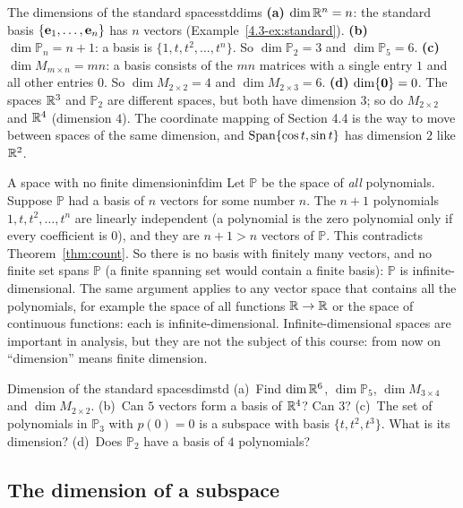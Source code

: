 \documentclass[11pt]{article}
\begin{document}
\begin{exmp}{The dimensions of the standard spaces}{stddims}
\textbf{(a)} $\dim\mathbb{R}^n=n$: the standard basis $\{\mathbf{e}_1,\dots,\mathbf{e}_n\}$ has $n$ vectors (Example~\ref{4.3-ex:standard}). \textbf{(b)} $\dim\mathbb{P}_n=n+1$: a basis is $\{1,t,t^2,\dots,t^n\}$. So $\dim\mathbb{P}_2=3$ and $\dim\mathbb{P}_5=6$. \textbf{(c)} $\dim M_{m\times n}=mn$: a basis consists of the $mn$ matrices with a single entry $1$ and all other entries $0$. So $\dim M_{2\times2}=4$ and $\dim M_{2\times3}=6$. \textbf{(d)} $\dim\{\mathbf{0}\}=0$. The spaces $\mathbb{R}^3$ and $\mathbb{P}_2$ are different spaces, but both have dimension $3$; so do $M_{2\times2}$ and $\mathbb{R}^4$ (dimension $4$). The coordinate mapping of Section 4.4 is the way to move between spaces of the same dimension, and $\operatorname{Span}\{\cos t,\sin t\}$ has dimension $2$ like $\mathbb{R}^2$.
\end{exmp}

\begin{exmp}{A space with no finite dimension}{infdim}
Let $\mathbb{P}$ be the space of \emph{all} polynomials. Suppose $\mathbb{P}$ had a basis of $n$ vectors for some number $n$. The $n+1$ polynomials $1,t,t^2,\dots,t^n$ are linearly independent (a polynomial is the zero polynomial only if every coefficient is $0$), and they are $n+1>n$ vectors of $\mathbb{P}$. This contradicts Theorem~\ref{thm:count}. So there is no basis with finitely many vectors, and no finite set spans $\mathbb{P}$ (a finite spanning set would contain a finite basis): $\mathbb{P}$ is infinite-dimensional. The same argument applies to any vector space that contains all the polynomials, for example the space of all functions $\mathbb{R}\to\mathbb{R}$ or the space of continuous functions: each is infinite-dimensional. Infinite-dimensional spaces are important in analysis, but they are not the subject of this course: from now on ``dimension'' means finite dimension.
\end{exmp}

\begin{kc}{Dimension of the standard spaces}{dimstd}
(a)~Find $\dim\mathbb{R}^6$, $\dim\mathbb{P}_5$, $\dim M_{3\times4}$ and $\dim M_{2\times2}$. (b)~Can $5$ vectors form a basis of $\mathbb{R}^4$? Can $3$? (c)~The set of polynomials in $\mathbb{P}_3$ with $p(0)=0$ is a subspace with basis $\{t,t^2,t^3\}$. What is its dimension? (d)~Does $\mathbb{P}_2$ have a basis of $4$ polynomials?
\end{kc}

\subsection*{The dimension of a subspace}
\end{document}
